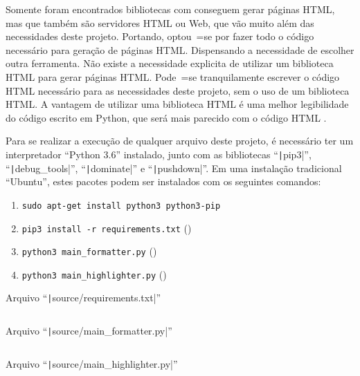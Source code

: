 Somente foram encontrados bibliotecas com  conseguem gerar páginas HTML,
mas que também são servidores HTML ou
Web,
que vão muito além das necessidades deste projeto.
Portando,
optou~=se por fazer todo o código necessário para geração de páginas HTML.
Dispensando a necessidade de escolher outra ferramenta.
Não existe a necessidade explicita de utilizar um biblioteca HTML para gerar páginas HTML.
Pode~=se tranquilamente escrever o código HTML necessário para as necessidades deste projeto,
sem o uso de um biblioteca HTML.
A vantagem de utilizar uma biblioteca HTML é uma melhor legibilidade do código escrito em Python,
que será mais parecido com o código HTML \cite{webDevelopmentWithDjango}.

Para se realizar a execução de qualquer arquivo deste projeto,
é necessário ter um interpretador ``Python 3.6'' instalado,
junto com as bibliotecas ``\texttt|pip3|'',
``\texttt|debug_tools|'', ``\texttt|dominate|'' e
``\texttt|pushdown|''.
Em uma instalação tradicional ``Ubuntu'',
estes pacotes podem ser instalados com os seguintes comandos:
\begin{enumerate}[1)]
\item \texttt{sudo apt-get install python3 python3-pip}
\item \texttt{pip3 install -r requirements.txt} ()
\item \texttt{python3 main_formatter.py} ()
\item \texttt{python3 main_highlighter.py} ()
\end{enumerate}

\begin{code}
\caption[Arquivo ``source/requirements.txt'']{Arquivo ``\texttt|source/requirements.txt|''}
\label{code:requirementsTxt}
\inputminted{python3}{../source/requirements.txt}
\end{code}

\begin{code}
\caption[Arquivo ``source/main\_formatter.py'']{Arquivo ``\texttt|source/main_formatter.py|''}
\label{code:MainFormatterPy}
\inputminted[firstline=39,firstnumber=1]{python3}{../source/main_formatter.py}
\end{code}

\begin{code}
\caption[Arquivo ``source/main\_highlighter.py'']{Arquivo ``\texttt|source/main_highlighter.py|''}
\label{code:MainHighlighterPy}
\inputminted[firstline=39,firstnumber=1]{python3}{../source/main_highlighter.py}
\end{code}

